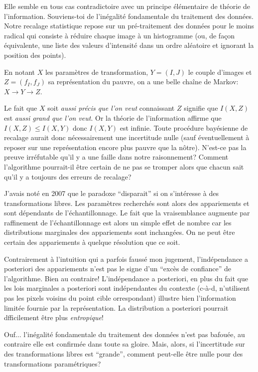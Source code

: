 \documentclass{article}
\begin{document}
Elle semble en tous cas contradictoire avec un principe \'el\'ementaire de th\'eorie de l'information. Souviens-toi de l'in\'egalit\'e fondamentale du traitement des donn\'ees. Notre recalage statistique repose sur un pr\'e-traitement des donn\'ees pour le moins radical qui consiste \`a r\'eduire chaque image \`a un histogramme (ou, de fa\c{c}on \'equivalente, une liste des valeurs d'intensit\'e dans un ordre al\'eatoire et ignorant la position des points).

En notant $X$ les param\`etres de transformation, $Y=(I, J)$ le couple d'images et $Z=(f_I, f_J)$ sa repr\'esentation du pauvre, on a une belle cha\^ine de Markov: $X \to Y \to Z$.

Le fait que $X$ soit {\em aussi pr\'ecis que l'on veut} connaissant $Z$ signifie que $I(X,Z)$ est {\em aussi grand que l'on veut}. Or la th\'eorie de l'information affirme que $I(X,Z) \leq I(X,Y)$ donc $I(X,Y)$ est infinie. Toute proc\'edure bay\'esienne de recalage aurait donc n\'ecessairement une incertitude nulle (sauf \'eventuellement \`a reposer sur une repr\'esentation encore plus pauvre que la n\^otre). N'est-ce pas la preuve irr\'efutable qu'il y a une faille dans notre raisonnement? Comment l'algorithme pourrait-il \^etre certain de ne pas se tromper alors que chacun sait qu'il y a toujours des erreurs de recalage?

J'avais not\'e en 2007 que le paradoxe ``disparait'' si on s'int\'eresse \`a des transformations libres. Les param\`etres recherch\'es sont alors des appariements et sont d\'ependants de l'\'echantillonnage. Le fait que la vraisemblance augmente par raffinement de l'\'echantillonnage est alors un simple effet de nombre car les distributions marginales des appariements sont inchang\'ees. On ne peut \^etre certain des appariements \`a quelque r\'esolution que ce soit. 

Contrairement \`a l'intuition qui a parfois fauss\'e mon jugement, l'ind\'ependance a posteriori des appariements n'est pas le signe d'un ``exc\`es de confiance'' de l'algorithme. Bien au contraire! L'ind\'ependance a posteriori, en plus du fait que les lois marginales a posteriori sont ind\'ependantes du contexte (c-\`a-d, n'utilisent pas les pixels voisins du point cible orrespondant) illustre bien l'information limit\'ee fournie par la repr\'esentation. La distribution a posteriori pourrait dfficilement \^etre plus {\em entropique}!

Ouf... l'in\'egalit\'e fondamentale du traitement des donn\'ees n'est pas bafou\'ee, au contraire elle est confirm\'ee dans toute sa gloire.  Mais, alors, si l'incertitude sur des transformations libres est ``grande'', comment peut-elle \^etre nulle pour des transformations param\'etriques? 
\end{document}
